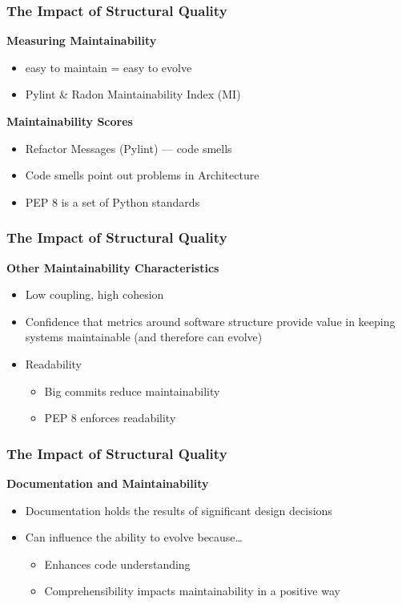 \documentclass{beamer}
\begin{document}
\begin{frame}
  \frametitle{The Impact of Structural Quality}
  \textbf{Measuring Maintainability}
  \begin{itemize}
    \item easy to maintain = easy to evolve
    \item Pylint \& Radon Maintainability Index (MI)
  \end{itemize}

  \vspace{0.35cm}
  \textbf{Maintainability Scores}
  \begin{itemize}
    \item Refactor Messages (Pylint) --- code smells
    \item Code smells point out problems in Architecture
    \item PEP 8 is a set of Python standards
  \end{itemize}
\end{frame}

\begin{frame}
  \frametitle{The Impact of Structural Quality}
  \textbf{Other Maintainability Characteristics}
  \begin{itemize}
    \item Low coupling, high cohesion
    \item Confidence that metrics around software structure provide value in keeping systems maintainable (and therefore can evolve) %
    \item Readability
    \begin{itemize}
      \item Big commits reduce maintainability
      \item PEP 8 enforces readability
    \end{itemize}
  \end{itemize}
\end{frame}

\begin{frame}
  \frametitle{The Impact of Structural Quality}
  \textbf{Documentation and Maintainability}
  \begin{itemize}
    \item Documentation holds the results of significant design decisions
    \item Can influence the ability to evolve because\dots
    \begin{itemize}
      \item Enhances code understanding
      \item Comprehensibility impacts maintainability in a positive way  
    \end{itemize}
  \end{itemize}
\end{frame}
\end{document}

